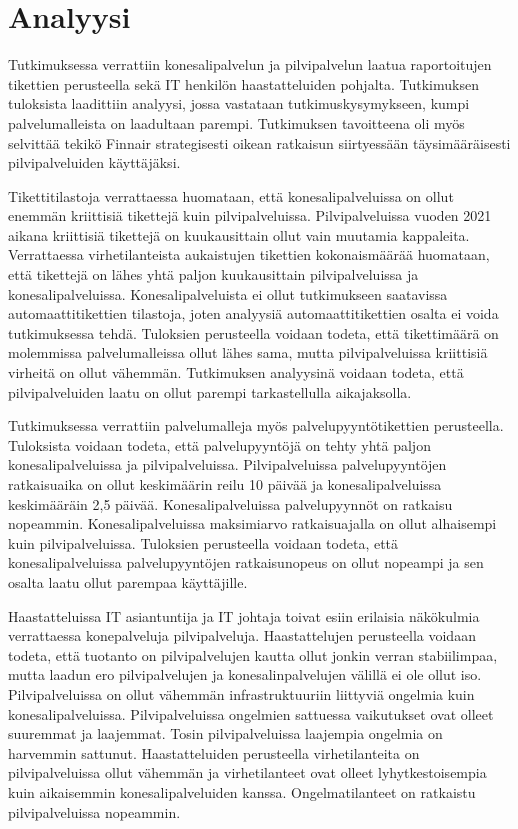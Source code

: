 \chapter{Analyysi\label{analyysi}}
Tutkimuksessa verrattiin konesalipalvelun ja pilvipalvelun laatua raportoitujen tikettien perusteella sekä IT henkilön haastatteluiden pohjalta. Tutkimuksen tuloksista laadittiin analyysi, jossa vastataan tutkimuskysymykseen, kumpi palvelumalleista on laadultaan parempi. Tutkimuksen tavoitteena oli myös selvittää tekikö Finnair strategisesti oikean ratkaisun siirtyessään täysimääräisesti pilvipalveluiden käyttäjäksi.

Tikettitilastoja verrattaessa huomataan, että konesalipalveluissa on ollut enemmän kriittisiä tikettejä kuin pilvipalveluissa.  Pilvipalveluissa vuoden 2021 aikana kriittisiä tikettejä on kuukausittain ollut vain muutamia kappaleita. Verrattaessa virhetilanteista aukaistujen tikettien kokonaismäärää huomataan, että tikettejä on lähes yhtä paljon kuukausittain pilvipalveluissa ja konesalipalveluissa. Konesalipalveluista ei ollut tutkimukseen saatavissa automaattitikettien tilastoja, joten analyysiä automaattitikettien osalta ei voida tutkimuksessa tehdä. Tuloksien perusteella voidaan todeta, että tikettimäärä on molemmissa palvelumalleissa ollut lähes sama, mutta pilvipalveluissa kriittisiä virheitä on ollut vähemmän. Tutkimuksen analyysinä voidaan todeta, että pilvipalveluiden laatu on ollut parempi tarkastellulla aikajaksolla.

Tutkimuksessa verrattiin palvelumalleja myös palvelupyyntötikettien perusteella. Tuloksista voidaan todeta, että palvelupyyntöjä on tehty yhtä paljon konesalipalveluissa ja pilvipalveluissa. Pilvipalveluissa palvelupyyntöjen ratkaisuaika on ollut keskimäärin reilu 10 päivää ja konesalipalveluissa keskimääräin 2,5 päivää. Konesalipalveluissa palvelupyynnöt on ratkaisu nopeammin. Konesalipalveluissa maksimiarvo ratkaisuajalla on ollut alhaisempi kuin pilvipalveluissa. Tuloksien perusteella voidaan todeta, että konesalipalveluissa palvelupyyntöjen ratkaisunopeus on ollut nopeampi ja sen osalta laatu ollut parempaa käyttäjille.

Haastatteluissa IT asiantuntija ja IT johtaja toivat esiin erilaisia näkökulmia verrattaessa konepalveluja pilvipalveluja. Haastattelujen perusteella voidaan todeta, että tuotanto on pilvipalvelujen kautta ollut jonkin verran stabiilimpaa, mutta laadun ero pilvipalvelujen ja konesalinpalvelujen välillä ei ole ollut iso. Pilvipalveluissa on ollut vähemmän infrastruktuuriin liittyviä ongelmia kuin konesalipalveluissa. Pilvipalveluissa ongelmien sattuessa vaikutukset ovat olleet suuremmat ja laajemmat. Tosin pilvipalveluissa laajempia ongelmia on harvemmin sattunut. Haastatteluiden perusteella virhetilanteita on pilvipalveluissa ollut vähemmän ja virhetilanteet ovat olleet lyhytkestoisempia kuin aikaisemmin konesalipalveluiden kanssa. Ongelmatilanteet on ratkaistu pilvipalveluissa nopeammin.

